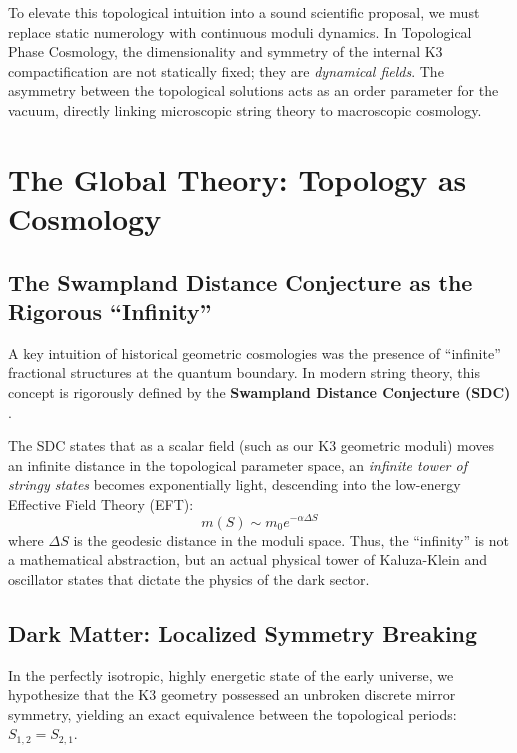 \documentclass[aps,prd,twocolumn,nofootinbib,superscriptaddress,10pt]{revtex4-2}
\begin{document}
To elevate this topological intuition into a sound scientific proposal, we must replace static numerology with continuous moduli dynamics. In Topological Phase Cosmology, the dimensionality and symmetry of the internal K3 compactification are not statically fixed; they are \textit{dynamical fields}. The asymmetry between the topological solutions acts as an order parameter for the vacuum, directly linking microscopic string theory to macroscopic cosmology.

\section{The Global Theory: Topology as Cosmology}

\subsection{The Swampland Distance Conjecture as the Rigorous ``Infinity''}
A key intuition of historical geometric cosmologies was the presence of ``infinite'' fractional structures at the quantum boundary. In modern string theory, this concept is rigorously defined by the \textbf{Swampland Distance Conjecture (SDC)} \cite{Ooguri2006}. 

The SDC states that as a scalar field (such as our K3 geometric moduli) moves an infinite distance in the topological parameter space, an \textit{infinite tower of stringy states} becomes exponentially light, descending into the low-energy Effective Field Theory (EFT):
\begin{equation}
    m(S) \sim m_0 e^{-\alpha \Delta S}
\end{equation}
where $\Delta S$ is the geodesic distance in the moduli space. Thus, the ``infinity'' is not a mathematical abstraction, but an actual physical tower of Kaluza-Klein and oscillator states that dictate the physics of the dark sector.

\subsection{Dark Matter: Localized Symmetry Breaking}
In the perfectly isotropic, highly energetic state of the early universe, we hypothesize that the K3 geometry possessed an unbroken discrete mirror symmetry, yielding an exact equivalence between the topological periods: $S_{1,2} = S_{2,1}$. 
\end{document}

